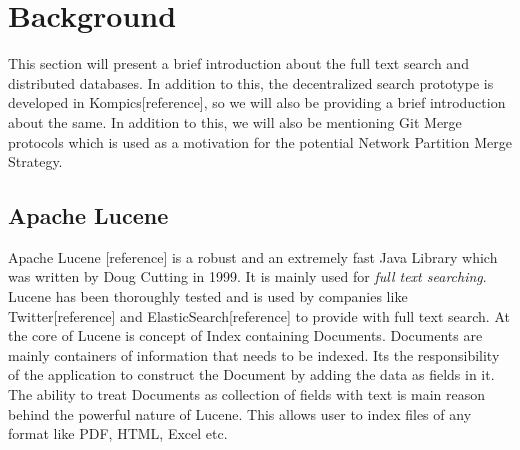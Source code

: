 \documentclass[12pt,a4paper,twoside,openright]{book}
\begin{document}
\chapter{Background}
\label{chap:background}

This section will present a brief introduction about the full text search and distributed databases. In addition to this, the decentralized search prototype is developed in Kompics[reference], so we will also be providing a brief introduction about the same. In addition to this, we will also be mentioning Git Merge protocols which is used as a motivation for the potential Network Partition Merge Strategy.


\section{Apache Lucene}

Apache Lucene [reference] is a robust and an extremely fast Java Library which was written by Doug Cutting in 1999. It is mainly used for \textit{full text searching}. Lucene has been thoroughly tested and is used by companies like Twitter[reference] and ElasticSearch[reference] to provide with full text search. At the core of Lucene is concept of Index containing Documents. Documents are mainly containers of information that needs to be indexed. Its the responsibility of the application to construct the Document by adding the data as fields in it. The ability to treat Documents as collection of fields with text is main reason behind the powerful nature of Lucene. This allows user to index files of any format like PDF, HTML, Excel etc. 
\end{document}
